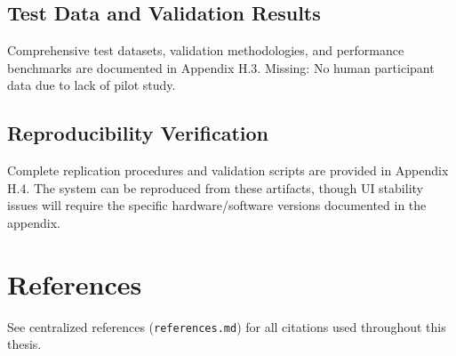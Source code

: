 \subsection{Test Data and Validation Results}
Comprehensive test datasets, validation methodologies, and performance benchmarks are documented in Appendix H.3. Missing: No human participant data due to lack of pilot study.

\subsection{Reproducibility Verification}
Complete replication procedures and validation scripts are provided in Appendix H.4. The system can be reproduced from these artifacts, though UI stability issues will require the specific hardware/software versions documented in the appendix.

\section{References}
See centralized references (\texttt{references.md}) for all citations used throughout this thesis.
